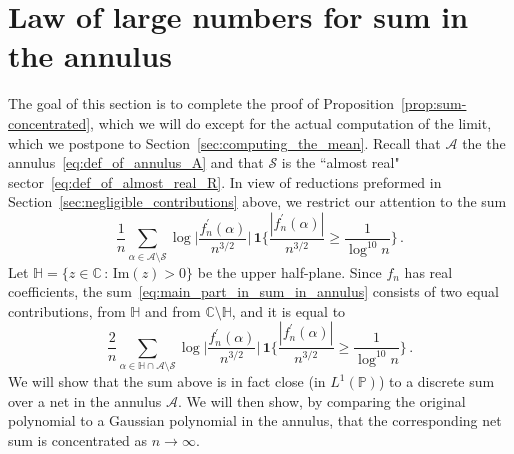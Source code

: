 \documentclass[11pt]{amsart}
\theoremstyle{remark}
\theoremstyle{definition}
\newcommand{\bC}{\mathbb C}
\newcommand{\bP}{\mathbb P}
\newcommand{\cA}{\mathcal A}
\newcommand{\one}{\boldsymbol{1}}
\begin{document}
    \section{Law of large numbers for sum in the annulus}
    \label{sec:lln_for_sum_in_annulus}
    The goal of this section is to complete the proof of Proposition~\ref{prop:sum-concentrated}, which we will do except for the actual computation of the limit, which we postpone to Section~\ref{sec:computing_the_mean}. Recall that $\mathcal{A}$ the the annulus~\eqref{eq:def_of_annulus_A} and that $\mathcal{S}$ is the ``almost real" sector~\eqref{eq:def_of_almost_real_R}. In view of reductions preformed in Section~\ref{sec:negligible_contributions} above, we restrict our attention to the sum
    \begin{equation}
    \label{eq:main_part_in_sum_in_annulus}
        \frac{1}{n} \sum_{\alpha\in \mathcal{A}\setminus \mathcal{S}} \log\Big|\frac{f_n^\prime(\alpha)}{n^{3/2}}\Big| \,  \one\Big\{\frac{|f_n^\prime(\alpha)|}{n^{3/2} } \ge \frac{1}{\log^{10}n}\Big\} \, .
    \end{equation}
    Let $\mathbb{H} = \big\{ z\in \bC \, : \, \text{Im}(z)>0 \big\} $ be the upper half-plane. Since $f_n$ has real coefficients, the sum~\eqref{eq:main_part_in_sum_in_annulus} consists of two equal contributions, from $\mathbb{H}$ and from $\bC\setminus \mathbb{H}$, and it is equal to
    \begin{equation*}
        \frac{2}{n} \sum_{\alpha\in \mathbb{H}\cap \mathcal{A}\setminus \mathcal{S}} \log\Big|\frac{f_n^\prime(\alpha)}{n^{3/2}}\Big| \,  \one\Big\{\frac{|f_n^\prime(\alpha)|}{n^{3/2} } \ge \frac{1}{\log^{10}n}\Big\} \, .
    \end{equation*}
    We will show that the sum above is in fact close (in $L^1(\bP)$) to a discrete sum over a net in the annulus $\cA$. We will then show, by comparing the original polynomial to a Gaussian polynomial in the annulus, that the corresponding net sum is concentrated as $n\to \infty$.
\end{document}
